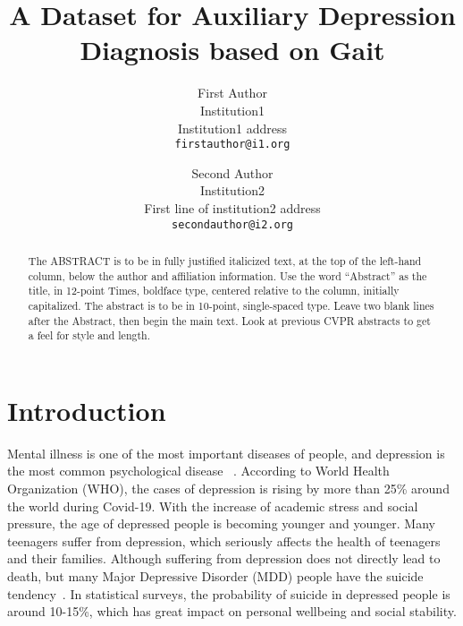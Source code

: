 \documentclass[10pt,twocolumn,letterpaper]{article}
\def\confName{CVPR}
\begin{document}
\title{A Dataset for Auxiliary Depression Diagnosis based on Gait}

\author{First Author\\
Institution1\\
Institution1 address\\
{\tt\small firstauthor@i1.org}
\and
Second Author\\
Institution2\\
First line of institution2 address\\
{\tt\small secondauthor@i2.org}
}
\maketitle

\begin{abstract}
   The ABSTRACT is to be in fully justified italicized text, at the top of the left-hand column, below the author and affiliation information.
   Use the word ``Abstract'' as the title, in 12-point Times, boldface type, centered relative to the column, initially capitalized.
   The abstract is to be in 10-point, single-spaced type.
   Leave two blank lines after the Abstract, then begin the main text.
   Look at previous CVPR abstracts to get a feel for style and length.
\end{abstract}

\section{Introduction}
\label{sec:intro}

Mental illness is one of the most important diseases of people, and depression is the most common psychological disease ~\cite{world2017depression,bhugra2004globalisation,rao2008understanding}. 
According to World Health Organization (WHO), the cases of depression is rising by more than 25\% around the world during Covid-19. With the increase of academic stress and social pressure, the age of depressed people is becoming younger and younger. Many teenagers suffer from depression, which seriously affects the health of teenagers and their families. 
Although suffering from depression does not directly lead to death, but many Major Depressive Disorder (MDD) people have the suicide tendency~\cite{eisenberg2007prevalence,bergfeld2018treatment,hemming2019alexithymia}. 
In statistical surveys, the probability of suicide in depressed people is around 10-15\%, which has great impact on personal wellbeing and social stability.
\end{document}
